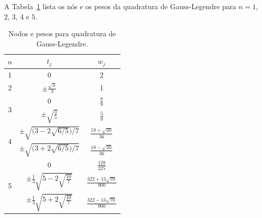 A Tabela~\ref{tab:gauss-legendre} lista os nós e os pesos da quadratura de Gauss-Legendre para $n=1$, $2$, $3$, $4$ e $5$.

\renewcommand{\arraystretch}{2.25}
\begin{table}
  \centering
  \caption{Nodos e pesos para quadratura de Gauss-Legendre.}
  \begin{tabular}{c|cc}
    $n$ & $t_j$ & $w_j$\\[2pt]\hline
    1  & 0 & 2 \\ \hline
    2  & $\displaystyle \pm \frac{\sqrt{3}}{3}$ & 1 \\ \hline
    \multirow{2}{*}{3} &0& $\displaystyle \frac{8}{9}$ \\
        & $\displaystyle \pm \sqrt{\frac{3}{5}}$ & $\displaystyle \frac{5}{9}$ \\\hline
    \multirow{2}{*}{4} & $\displaystyle \pm\sqrt{\Big( 3 - 2\sqrt{6/5} \Big)/7}$ & $\displaystyle \tfrac{18+\sqrt{30}}{36}$\\
        & $\displaystyle \pm\sqrt{\Big( 3 + 2\sqrt{6/5} \Big)/7}$ & $\displaystyle \tfrac{18-\sqrt{30}}{36}$\\\hline
    \multirow{3}{*}{5} & $0$ & $\displaystyle \frac{128}{225}$\\
                       & $\displaystyle \pm\frac{1}{3}\sqrt{5-2\sqrt{\frac{10}{7}}}$ & $\displaystyle \frac{322+13\sqrt{70}}{900}$\\[10pt]
                       & $\displaystyle \pm\frac{1}{3}\sqrt{5+2\sqrt{\frac{10}{7}}}$ & $\displaystyle \frac{322-13\sqrt{70}}{900}$\\[10pt]\hline
\end{tabular}
  \label{tab:gauss-legendre}
\end{table}
\renewcommand{\arraystretch}{1.25}

